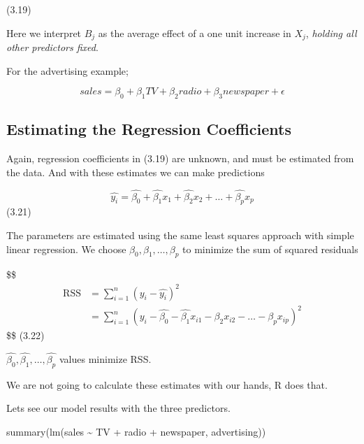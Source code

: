 \documentclass[
  letterpaper,
  DIV=11,
  numbers=noendperiod]{scrreprt}
\newenvironment{Shaded}{\begin{snugshade}}{\end{snugshade}}
\newcommand{\FunctionTok}[1]{\textcolor[rgb]{0.02,0.16,0.49}{#1}}
\newcommand{\NormalTok}[1]{\textcolor[rgb]{0.33,0.33,0.33}{#1}}
\newcommand{\SpecialCharTok}[1]{\textcolor[rgb]{0.00,0.46,0.62}{#1}}
\begin{document}
(3.19)

Here we interpret \(B_j\) as the average effect of a one unit increase
in \(X_j\), \emph{holding all other predictors fixed}.

For the advertising example;

\[
sales = \beta_0 + \beta_1 TV + \beta_2 radio + \beta_3 newspaper + \epsilon
\]

\hypertarget{estimating-the-regression-coefficients}{%
\subsection{Estimating the Regression
Coefficients}\label{estimating-the-regression-coefficients}}

Again, regression coefficients in (3.19) are unknown, and must be
estimated from the data. And with these estimates we can make
predictions

\[
\hat{y_i} = \hat{\beta_0} + \hat{\beta_1}x_1 + \hat{\beta_2}x_2 + \dots + \hat{\beta_p}x_p
\] (3.21)

The parameters are estimated using the same least squares approach with
simple linear regression. We choose \(\beta_0, \beta_1, \dots, \beta_p\)
to minimize the sum of squared residuals

\$\$ \begin{align}

\text{RSS} &= \sum_{i = 1}^n(y_i - \hat{y_i})^2 \\
&= \sum_{i = 1}^n(y_i - \hat{\beta_0} - \hat{\beta_1}x_{i1} - \beta_2x_{i2} - \dots - \beta_px_{ip})^2

\end{align} \$\$ (3.22)

\(\hat{\beta_0}, \hat{\beta_1},\dots, \hat{\beta_p}\) values minimize
RSS.

We are not going to calculate these estimates with our hands, R does
that.

Lets see our model results with the three predictors.

\begin{Shaded}
\begin{Highlighting}[]
\FunctionTok{summary}\NormalTok{(}\FunctionTok{lm}\NormalTok{(sales }\SpecialCharTok{\textasciitilde{}}\NormalTok{ TV }\SpecialCharTok{+}\NormalTok{ radio }\SpecialCharTok{+}\NormalTok{ newspaper, advertising))}
\end{Highlighting}
\end{Shaded}
\end{document}
